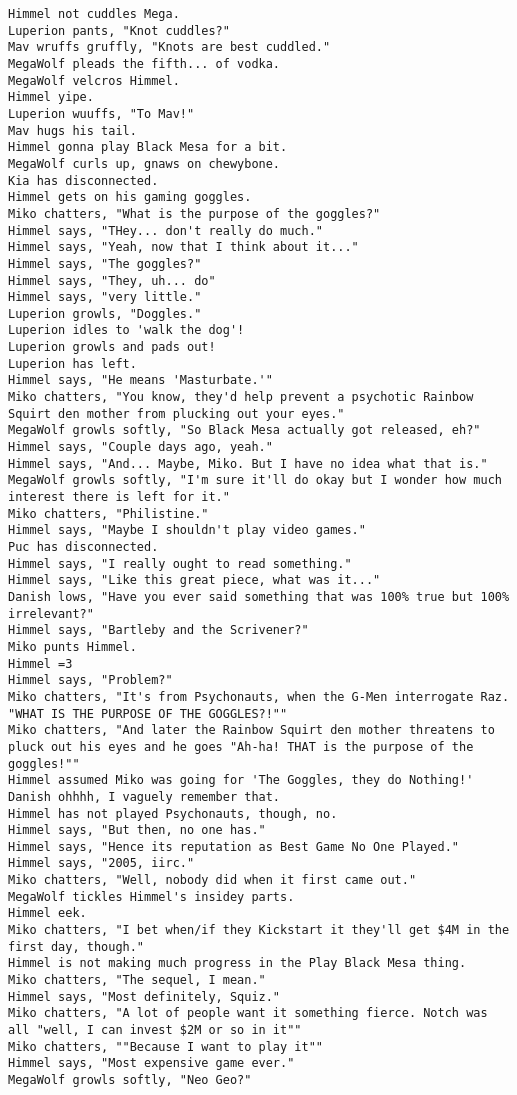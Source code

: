 \begin{verbatim}
Himmel not cuddles Mega.
Luperion pants, "Knot cuddles?"
Mav wruffs gruffly, "Knots are best cuddled."
MegaWolf pleads the fifth... of vodka.
MegaWolf velcros Himmel.
Himmel yipe.
Luperion wuuffs, "To Mav!"
Mav hugs his tail.
Himmel gonna play Black Mesa for a bit.
MegaWolf curls up, gnaws on chewybone.
Kia has disconnected.
Himmel gets on his gaming goggles.
Miko chatters, "What is the purpose of the goggles?"
Himmel says, "THey... don't really do much."
Himmel says, "Yeah, now that I think about it..."
Himmel says, "The goggles?"
Himmel says, "They, uh... do"
Himmel says, "very little."
Luperion growls, "Doggles."
Luperion idles to 'walk the dog'!
Luperion growls and pads out!
Luperion has left.
Himmel says, "He means 'Masturbate.'"
Miko chatters, "You know, they'd help prevent a psychotic Rainbow Squirt den mother from plucking out your eyes."
MegaWolf growls softly, "So Black Mesa actually got released, eh?"
Himmel says, "Couple days ago, yeah."
Himmel says, "And... Maybe, Miko. But I have no idea what that is."
MegaWolf growls softly, "I'm sure it'll do okay but I wonder how much interest there is left for it."
Miko chatters, "Philistine."
Himmel says, "Maybe I shouldn't play video games."
Puc has disconnected.
Himmel says, "I really ought to read something."
Himmel says, "Like this great piece, what was it..."
Danish lows, "Have you ever said something that was 100% true but 100% irrelevant?"
Himmel says, "Bartleby and the Scrivener?"
Miko punts Himmel.
Himmel =3
Himmel says, "Problem?"
Miko chatters, "It's from Psychonauts, when the G-Men interrogate Raz. "WHAT IS THE PURPOSE OF THE GOGGLES?!""
Miko chatters, "And later the Rainbow Squirt den mother threatens to pluck out his eyes and he goes "Ah-ha! THAT is the purpose of the goggles!""
Himmel assumed Miko was going for 'The Goggles, they do Nothing!'
Danish ohhhh, I vaguely remember that.
Himmel has not played Psychonauts, though, no.
Himmel says, "But then, no one has."
Himmel says, "Hence its reputation as Best Game No One Played."
Himmel says, "2005, iirc."
Miko chatters, "Well, nobody did when it first came out."
MegaWolf tickles Himmel's insidey parts.
Himmel eek.
Miko chatters, "I bet when/if they Kickstart it they'll get $4M in the first day, though."
Himmel is not making much progress in the Play Black Mesa thing.
Miko chatters, "The sequel, I mean."
Himmel says, "Most definitely, Squiz."
Miko chatters, "A lot of people want it something fierce. Notch was all "well, I can invest $2M or so in it""
Miko chatters, ""Because I want to play it""
Himmel says, "Most expensive game ever."
MegaWolf growls softly, "Neo Geo?"

\end{verbatim}
